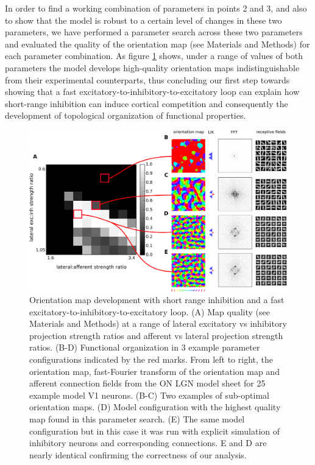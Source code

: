\documentclass[utf8]{frontiersSCNS}
\begin{document}
In order to find a working combination of parameters in points 2 and 3, and also to show that the model is robust to a certain level of changes
in these two parameters, we have performed a parameter search across these two parameters and evaluated the quality of the orientation map (see Materials and Methods) for each 
parameter combination. As figure \ref{fig:figure1} shows, under a range of values of both parameters the model develops high-quality orientation maps indistinguishable
from their experimental counterparts, thus concluding our first step towards showing that a fast excitatory-to-inhibitory-to-excitatory loop can explain 
how short-range inhibition can induce cortical competition and consequently the development of topological organization of functional properties.


\begin{figure}[htpb!] 
\centering
\includegraphics[width=16cm]{./SVG/Figure1/figure1.png}
\caption{Orientation map development with short range inhibition and a fast excitatory-to-inhibitory-to-excitatory loop. (A) Map quality (see Materials and Methods) at a range of 
lateral excitatory vs inhibitory projection strength ratios and afferent vs lateral projection strength ratios. (B-D) Functional organization in 3 example parameter configurations 
indicated by the red marks. From left to right, the orientation map, fast-Fourier transform of the orientation map and afferent connection fields from the ON LGN model sheet for 25 example model V1 neurons. 
(B-C) Two examples of sub-optimal orientation maps. (D) Model configuration with the highest quality map found in this parameter search. 
(E) The same model configuration but in this case it was run with explicit simulation of inhibitory neurons and corresponding connections. E and D are nearly identical confirming the correctness of our analysis.
}
\label{fig:figure1}
\end{figure} 
\end{document}

